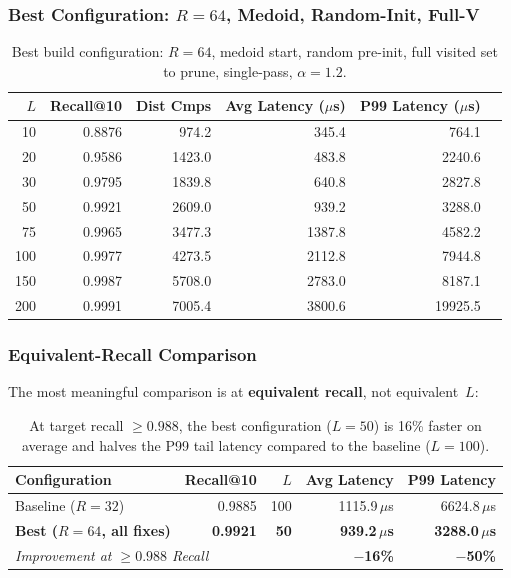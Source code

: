 \documentclass[10pt]{article}
\begin{document}
\subsubsection{Best Configuration: $R=64$, Medoid, Random-Init, Full-V}

\begin{table}[H]
\centering
\begin{tabular}{rrrrrr}
\toprule
$L$ & Recall@10 & Dist Cmps & Avg Latency ($\mu$s) & P99 Latency ($\mu$s) \\
\midrule
10  & 0.8876 & 974.2  & 345.4  & 764.1 \\
20  & 0.9586 & 1423.0 & 483.8  & 2240.6 \\
30  & 0.9795 & 1839.8 & 640.8  & 2827.8 \\
50  & 0.9921 & 2609.0 & 939.2  & 3288.0 \\
75  & 0.9965 & 3477.3 & 1387.8 & 4582.2 \\
100 & 0.9977 & 4273.5 & 2112.8 & 7944.8 \\
150 & 0.9987 & 5708.0 & 2783.0 & 8187.1 \\
200 & 0.9991 & 7005.4 & 3800.6 & 19925.5 \\
\bottomrule
\end{tabular}
\caption{Best build configuration: $R=64$, medoid start, random pre-init, full visited set to prune, single-pass, $\alpha=1.2$.}
\label{tab:best_build}
\end{table}

\subsubsection{Equivalent-Recall Comparison}

The most meaningful comparison is at \textbf{equivalent recall}, not equivalent~$L$:

\begin{table}[H]
\centering
\begin{tabular}{lrrrr}
\toprule
\textbf{Configuration} & \textbf{Recall@10} & \textbf{$L$} & \textbf{Avg Latency} & \textbf{P99 Latency} \\
\midrule
Baseline ($R=32$) & 0.9885 & 100 & 1115.9\,$\mu$s & 6624.8\,$\mu$s \\
\textbf{Best ($R=64$, all fixes)} & \textbf{0.9921} & \textbf{50}  & \textbf{939.2\,$\mu$s} & \textbf{3288.0\,$\mu$s} \\
\midrule
\multicolumn{3}{l}{\textit{Improvement at $\geq 0.988$ Recall}} & \textbf{$-$16\%} & \textbf{$-$50\%} \\
\bottomrule
\end{tabular}
\caption{At target recall $\ge 0.988$, the best configuration ($L=50$) is 16\% faster on average and halves the P99 tail latency compared to the baseline ($L=100$).}
\label{tab:equiv_recall}
\end{table}
\end{document}
